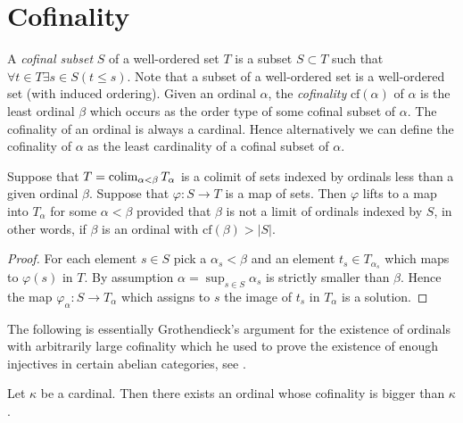 \section{Cofinality}
\label{section-cofinality}

\noindent
A {\it cofinal subset} $S$ of a well-ordered set $T$ is a subset
$S \subset T$ such that $\forall t \in T \exists s\in S (t \leq s)$.
Note that a subset of a well-ordered set is a well-ordered set
(with induced ordering). Given an ordinal $\alpha$, the {\it cofinality}
$\text{cf}(\alpha)$ of $\alpha$ is the least ordinal $\beta$
which occurs as the order type of some cofinal subset of $\alpha$.
The cofinality of an ordinal is always a cardinal.
Hence alternatively we can define the cofinality of
$\alpha$ as the least cardinality of a cofinal subset of $\alpha$.

\begin{lemma}
\label{lemma-map-from-set-lifts}
Suppose that $T = \mathop{\mathrm{colim}}\nolimits_{\alpha < \beta} T_\alpha$
is a colimit of sets indexed by ordinals less than a given ordinal $\beta$.
Suppose that $\varphi : S \to T$ is a map of sets.
Then $\varphi$ lifts to a map into $T_\alpha$ for some $\alpha < \beta$
provided that $\beta$ is not a limit of ordinals indexed by $S$,
in other words, if $\beta$ is an ordinal with $\text{cf}(\beta) > |S|$.
\end{lemma}

\begin{proof}
For each element $s \in S$ pick a $\alpha_s < \beta$ and an element
$t_s \in T_{\alpha_s}$ which maps to $\varphi(s)$ in $T$.
By assumption $\alpha = \sup_{s \in S} \alpha_s$ is strictly smaller
than $\beta$. Hence the map $\varphi_\alpha : S \to T_\alpha$
which assigns to $s$ the image of $t_s$ in $T_\alpha$ is a solution.
\end{proof}

\noindent
The following is essentially Grothendieck's argument for the existence
of ordinals with arbitrarily large cofinality which he used to prove
the existence of enough injectives in certain abelian categories, see
\cite{Tohoku}.

\begin{proposition}
\label{proposition-exist-ordinals-large-cofinality}
Let $\kappa$ be a cardinal. Then there exists an ordinal
whose cofinality is bigger than $\kappa$.
\end{proposition}

